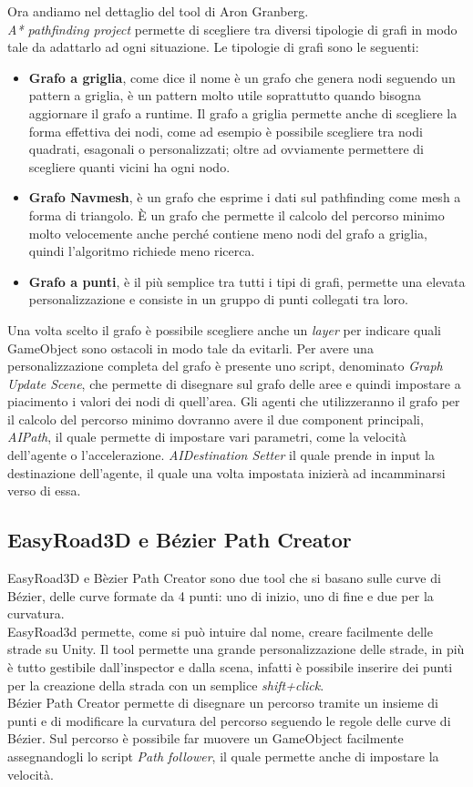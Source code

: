 \documentclass[12pt, openany]{book}
\begin{document}
		Ora andiamo nel dettaglio del tool di Aron Granberg. \\
		\emph{A* pathfinding project} permette di scegliere tra diversi tipologie di grafi in modo tale da adattarlo ad ogni situazione. Le tipologie di grafi sono le seguenti:
		\begin{itemize}
			\item \textbf{Grafo a griglia}, come dice il nome è un grafo che genera nodi seguendo un pattern a griglia, è un pattern molto utile soprattutto quando bisogna aggiornare il grafo a runtime. Il grafo a griglia permette anche di scegliere la forma effettiva dei nodi, come ad esempio è possibile scegliere tra nodi quadrati, esagonali o personalizzati; oltre ad ovviamente permettere di scegliere quanti vicini ha ogni nodo.
			\item \textbf{Grafo Navmesh}, è un grafo che esprime i dati sul pathfinding come mesh a forma di triangolo. È un grafo che permette il calcolo del percorso minimo molto velocemente anche perché contiene meno nodi del grafo a griglia, quindi l'algoritmo richiede meno ricerca.
			\item \textbf{Grafo a punti}, è il più semplice tra tutti i tipi di grafi, permette una elevata personalizzazione e consiste in un gruppo di punti collegati tra loro.
		\end{itemize}
	Una volta scelto il grafo è possibile scegliere anche un \emph{layer} per indicare quali GameObject sono ostacoli in modo tale da evitarli.
	Per avere una personalizzazione completa del grafo è presente uno script, denominato \emph{Graph Update Scene}, che permette di disegnare sul grafo delle aree e quindi impostare a piacimento i valori dei nodi di quell'area.
	Gli agenti che utilizzeranno il grafo per il calcolo del percorso minimo dovranno avere il due component principali, \emph{AIPath}, il quale permette di impostare vari parametri, come la velocità dell'agente o l'accelerazione. \emph{AIDestination Setter} il quale prende in input la destinazione dell'agente, il quale una volta impostata inizierà ad incamminarsi verso di essa. 
	
	\subsection{EasyRoad3D e Bézier Path Creator}
	EasyRoad3D e Bèzier Path Creator sono due tool che si basano sulle curve di Bézier, delle curve formate da 4 punti: uno di inizio, uno di fine e due per la curvatura. \\
	EasyRoad3d permette, come si può intuire dal nome, creare facilmente delle strade su Unity. Il tool permette una grande personalizzazione delle strade, in più è tutto gestibile dall'inspector e dalla scena, infatti è possibile inserire dei punti per la creazione della strada con un semplice \emph{shift+click}.\\
	Bézier Path Creator permette di disegnare un percorso tramite un insieme di punti e di modificare la curvatura del percorso seguendo le regole delle curve di Bézier. Sul percorso è possibile far muovere un GameObject facilmente assegnandogli lo script \emph{Path follower}, il quale permette anche di impostare la velocità.
	
\end{document}
